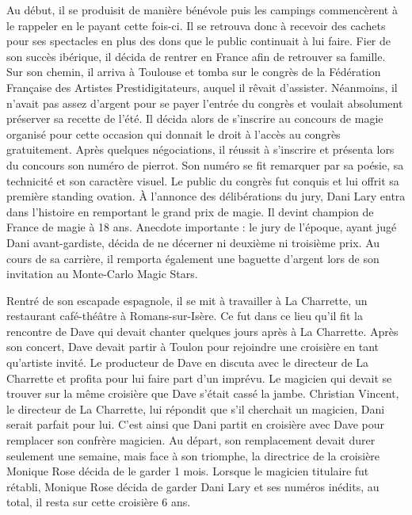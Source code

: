 Au début, il se produisit de manière bénévole puis les campings commencèrent à le rappeler en le payant cette fois-ci. Il se retrouva donc à recevoir des cachets pour ses spectacles en plus des dons que le public continuait à lui faire. Fier de son succès ibérique, il décida de rentrer en France afin de retrouver sa famille. Sur son chemin, il arriva à Toulouse et tomba sur le congrès de la Fédération Française des Artistes Prestidigitateurs, auquel il rêvait d’assister. Néanmoins, il n’avait pas assez d’argent pour se payer l’entrée du congrès et voulait absolument préserver sa recette de l’été. Il décida alors de s’inscrire au concours de magie organisé pour cette occasion qui donnait le droit à l’accès au congrès gratuitement. Après quelques négociations, il réussit à s’inscrire et présenta lors du concours son numéro de pierrot. Son numéro se fit remarquer par sa poésie, sa technicité et son caractère visuel. Le public du congrès fut conquis et lui offrit sa première standing ovation. À l’annonce des délibérations du jury, Dani Lary entra dans l’histoire en remportant le grand prix de magie. Il devint champion de France de magie à 18 ans. Anecdote importante : le jury de l’époque, ayant jugé Dani avant-gardiste, décida de ne décerner ni deuxième ni troisième prix. Au cours de sa carrière, il remporta également une baguette d’argent lors de son invitation au Monte-Carlo Magic Stars. 

Rentré de son escapade espagnole, il se mit à travailler à La Charrette, un restaurant café-théâtre à Romans-sur-Isère. Ce fut dans ce lieu qu’il fit la rencontre de Dave qui devait chanter quelques jours après à La Charrette. Après son concert, Dave devait partir à Toulon pour rejoindre une croisière en tant qu’artiste invité. Le producteur de Dave en discuta avec le directeur de La Charrette et profita pour lui faire part d’un imprévu. Le magicien qui devait se trouver sur la même croisière que Dave s’était cassé la jambe. Christian Vincent, le directeur de La Charrette, lui répondit que s’il cherchait un magicien, Dani serait parfait pour lui. C’est ainsi que Dani partit en croisière avec Dave pour remplacer son confrère magicien. Au départ, son remplacement devait durer seulement une semaine, mais face à son triomphe, la directrice de la croisière Monique Rose décida de le garder 1 mois. Lorsque le magicien titulaire fut rétabli, Monique Rose décida de garder Dani Lary et ses numéros inédits, au total, il resta sur cette croisière 6 ans. 


